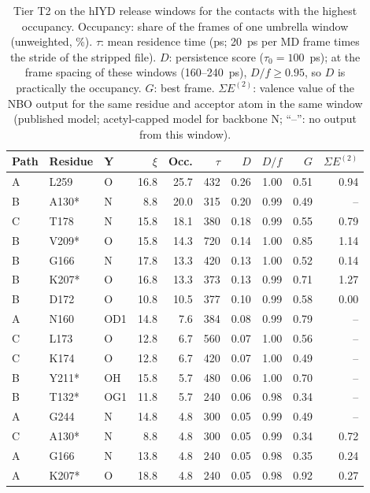 \documentclass[journal=jcisd8,manuscript=suppinfo]{achemso}
\begin{document}
\begin{singlespace}
\begin{table}[!htbp]\centering\scriptsize\setlength{\tabcolsep}{3pt}
\caption{Tier T2 on the hIYD release windows for the contacts with the highest occupancy. Occupancy: share of the frames of one umbrella window (unweighted, \%). $\tau$: mean residence time (ps; 20~ps per MD frame times the stride of the stripped file). $D$: persistence score ($\tau_0 = 100$~ps); at the frame spacing of these windows (160--240~ps), $D/f \ge 0.95$, so $D$ is practically the occupancy. $G$: best frame. $\Sigma E^{(2)}$: valence value of the NBO output for the same residue and acceptor atom in the same window (published model; acetyl-capped model for backbone N; ``--'': no output from this window).}\label{tab:hiydt5}
\begin{tabular}{lllrrrrrrr}\toprule Path & Residue & Y & $\xi$ & Occ. & $\tau$ & $D$ & $D/f$ & $G$ & $\Sigma E^{(2)}$\\\midrule
A & L259 & O & 16.8 & 25.7 & 432 & 0.26 & 1.00 & 0.51 & 0.94\\
B & A130* & N & 8.8 & 20.0 & 315 & 0.20 & 0.99 & 0.49 & --\\
C & T178 & N & 15.8 & 18.1 & 380 & 0.18 & 0.99 & 0.55 & 0.79\\
B & V209* & O & 15.8 & 14.3 & 720 & 0.14 & 1.00 & 0.85 & 1.14\\
B & G166 & N & 17.8 & 13.3 & 420 & 0.13 & 1.00 & 0.52 & 0.14\\
B & K207* & O & 16.8 & 13.3 & 373 & 0.13 & 0.99 & 0.71 & 1.27\\
B & D172 & O & 10.8 & 10.5 & 377 & 0.10 & 0.99 & 0.58 & 0.00\\
A & N160 & OD1 & 14.8 & 7.6 & 384 & 0.08 & 0.99 & 0.79 & --\\
C & L173 & O & 12.8 & 6.7 & 560 & 0.07 & 1.00 & 0.56 & --\\
C & K174 & O & 12.8 & 6.7 & 420 & 0.07 & 1.00 & 0.49 & --\\
B & Y211* & OH & 15.8 & 5.7 & 480 & 0.06 & 1.00 & 0.70 & --\\
B & T132* & OG1 & 11.8 & 5.7 & 240 & 0.06 & 0.98 & 0.34 & --\\
A & G244 & N & 14.8 & 4.8 & 300 & 0.05 & 0.99 & 0.49 & --\\
C & A130* & N & 8.8 & 4.8 & 300 & 0.05 & 0.99 & 0.34 & 0.72\\
A & G166 & N & 13.8 & 4.8 & 240 & 0.05 & 0.98 & 0.35 & 0.24\\
A & K207* & O & 18.8 & 4.8 & 240 & 0.05 & 0.98 & 0.92 & 0.27\\

\end{tabular}
\end{table}
\end{singlespace}
\end{document}
